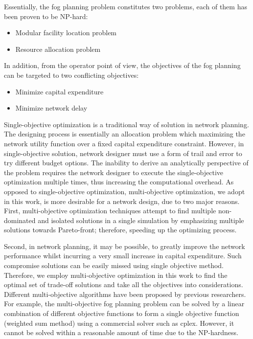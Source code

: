 \documentclass[10pt,journal,compsoc]{IEEEtran}
\begin{document}

Essentially, the fog planning problem constitutes two problems, each of them has been proven to be NP-hard:
\begin{itemize}
\item Modular facility location problem
\item Resource allocation problem
\end{itemize}
In addition, from the operator point of view, the objectives of the fog planning can be targeted to two conflicting objectives:
\begin{itemize}
\item Minimize capital expenditure
\item Minimize network delay
\end{itemize}

Single-objective optimization is a traditional way of solution in network planning. The designing process is essentially an allocation problem which maximizing the network utility function over a fixed capital expenditure constraint. 
However, in single-objective solution, network designer must use a form of trail and error to try different budget options. The inability to derive an analytically perspective of the problem requires the network designer to execute the single-objective optimization multiple times, thus increasing the computational overhead. 
As opposed to single-objective optimization, multi-objective optimization, we adopt in this work, is more desirable for a network design, due to two major reasons. First, multi-objective optimization techniques attempt to find multiple non-dominated and isolated solutions in a single simulation by emphasizing multiple solutions towards Pareto-front; therefore, speeding up the optimizing process. 

Second, in network planning, it may be possible, to greatly improve the network performance whilst incurring a very small increase in capital expenditure. Such compromise solutions can be easily missed using single objective method. Therefore, we employ multi-objective optimization in this work to find the optimal set of trade-off solutions and take all the objectives into considerations.
\iffalse
Different multi-objective algorithms have been proposed by previous researchers. For example, the multi-objective fog planning problem can be solved by a linear combination of different objective functions to form a single objective function (weighted sum method) using a commercial solver such as cplex. However, it cannot be solved within a reasonable amount of time due to the NP-hardness.
\end{document}
